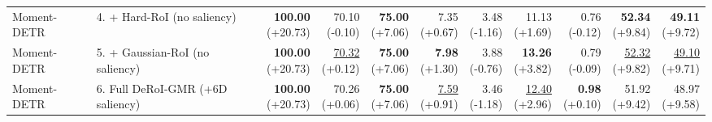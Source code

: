 \documentclass{article}
\begin{document}
{\begin{tabular}{llrrrrrrrrr}
Moment-DETR & 4. + Hard-RoI (no saliency) & \shortstack{\textbf{100.00} \\ {\scriptsize (+20.73)}} & \shortstack{70.10 \\ {\scriptsize (-0.10)}} & \shortstack{\textbf{75.00} \\ {\scriptsize (+7.06)}} & \shortstack{7.35 \\ {\scriptsize (+0.67)}} & \shortstack{3.48 \\ {\scriptsize (-1.16)}} & \shortstack{11.13 \\ {\scriptsize (+1.69)}} & \shortstack{0.76 \\ {\scriptsize (-0.12)}} & \shortstack{\textbf{52.34} \\ {\scriptsize (+9.84)}} & \shortstack{\textbf{49.11} \\ {\scriptsize (+9.72)}} \\
Moment-DETR & 5. + Gaussian-RoI (no saliency) & \shortstack{\textbf{100.00} \\ {\scriptsize (+20.73)}} & \shortstack{\underline{70.32} \\ {\scriptsize (+0.12)}} & \shortstack{\textbf{75.00} \\ {\scriptsize (+7.06)}} & \shortstack{\textbf{7.98} \\ {\scriptsize (+1.30)}} & \shortstack{3.88 \\ {\scriptsize (-0.76)}} & \shortstack{\textbf{13.26} \\ {\scriptsize (+3.82)}} & \shortstack{0.79 \\ {\scriptsize (-0.09)}} & \shortstack{\underline{52.32} \\ {\scriptsize (+9.82)}} & \shortstack{\underline{49.10} \\ {\scriptsize (+9.71)}} \\
Moment-DETR & 6. Full DeRoI-GMR (+6D saliency) & \shortstack{\textbf{100.00} \\ {\scriptsize (+20.73)}} & \shortstack{70.26 \\ {\scriptsize (+0.06)}} & \shortstack{\textbf{75.00} \\ {\scriptsize (+7.06)}} & \shortstack{\underline{7.59} \\ {\scriptsize (+0.91)}} & \shortstack{3.46 \\ {\scriptsize (-1.18)}} & \shortstack{\underline{12.40} \\ {\scriptsize (+2.96)}} & \shortstack{\textbf{0.98} \\ {\scriptsize (+0.10)}} & \shortstack{51.92 \\ {\scriptsize (+9.42)}} & \shortstack{48.97 \\ {\scriptsize (+9.58)}} \\

\end{tabular}}
\end{document}
